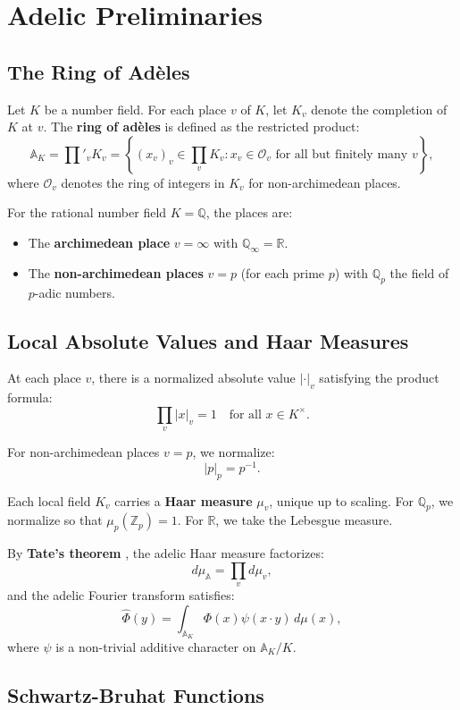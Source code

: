 \section{Adelic Preliminaries}

\subsection{The Ring of Adèles}

Let $K$ be a number field. For each place $v$ of $K$, let $K_v$ denote the completion of $K$ at $v$. The \textbf{ring of adèles} is defined as the restricted product:
\[
\mathbb{A}_K = \prod'_v K_v = \left\{ (x_v)_{v} \in \prod_v K_v : x_v \in \mathcal{O}_v \text{ for all but finitely many } v \right\},
\]
where $\mathcal{O}_v$ denotes the ring of integers in $K_v$ for non-archimedean places.

For the rational number field $K = \mathbb{Q}$, the places are:
\begin{itemize}
  \item The \textbf{archimedean place} $v = \infty$ with $\mathbb{Q}_\infty = \mathbb{R}$.
  \item The \textbf{non-archimedean places} $v = p$ (for each prime $p$) with $\mathbb{Q}_p$ the field of $p$-adic numbers.
\end{itemize}

\subsection{Local Absolute Values and Haar Measures}

At each place $v$, there is a normalized absolute value $|\cdot|_v$ satisfying the product formula:
\[
\prod_{v} |x|_v = 1 \quad \text{for all } x \in K^\times.
\]

For non-archimedean places $v = p$, we normalize:
\[
|p|_p = p^{-1}.
\]

Each local field $K_v$ carries a \textbf{Haar measure} $\mu_v$, unique up to scaling. For $\mathbb{Q}_p$, we normalize so that $\mu_p(\mathbb{Z}_p) = 1$. For $\mathbb{R}$, we take the Lebesgue measure.

By \textbf{Tate's theorem} \cite{tate1967}, the adelic Haar measure factorizes:
\[
d\mu_{\mathbb{A}} = \prod_v d\mu_v,
\]
and the adelic Fourier transform satisfies:
\[
\hat{\Phi}(y) = \int_{\mathbb{A}_K} \Phi(x) \psi(x \cdot y) \, d\mu(x),
\]
where $\psi$ is a non-trivial additive character on $\mathbb{A}_K/K$.

\subsection{Schwartz-Bruhat Functions}

